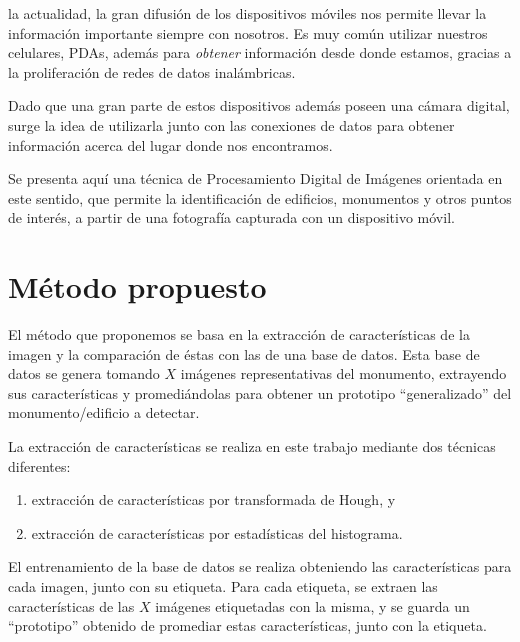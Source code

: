 \documentclass[conference,spanish,a4paper,10pt,oneside,final]{tfmpd}
\begin{document}
 la actualidad, la gran difusión de los dispositivos móviles nos
permite llevar la información importante siempre con nosotros.
Es muy común utilizar nuestros celulares, PDAs, además para \emph{obtener}
información desde donde estamos, gracias a la proliferación de redes de datos
inalámbricas.

Dado que una gran parte de estos dispositivos además poseen una cámara
digital, surge la idea de utilizarla junto con las conexiones de datos para
obtener información acerca del lugar donde nos encontramos.

Se presenta aquí una técnica de Procesamiento Digital de Imágenes orientada
en este sentido, que permite la
identificación de edificios, monumentos y otros puntos de interés, a partir
de una fotografía capturada con un dispositivo móvil.

%
%
%
%
\section{Método propuesto}
El método que proponemos se basa en la extracción de características de la
imagen y la comparación de éstas con las de una base de datos.
Esta base de datos se genera tomando $X$ imágenes representativas del monumento,
extrayendo sus características y promediándolas para obtener un prototipo
``generalizado'' del monumento/edificio a detectar.

La extracción de características se realiza en este trabajo mediante dos
técnicas diferentes:
\begin{enumerate}
\item extracción de características por transformada de Hough, y
\item extracción de características por estadísticas del histograma.
\end{enumerate}

El entrenamiento de la base de datos se realiza obteniendo las características
para cada imagen, junto con su etiqueta. Para cada etiqueta, se extraen las
características de las $X$ imágenes etiquetadas con la misma, y se guarda un
``prototipo'' obtenido de promediar estas características, junto con la
etiqueta.
\end{document}
